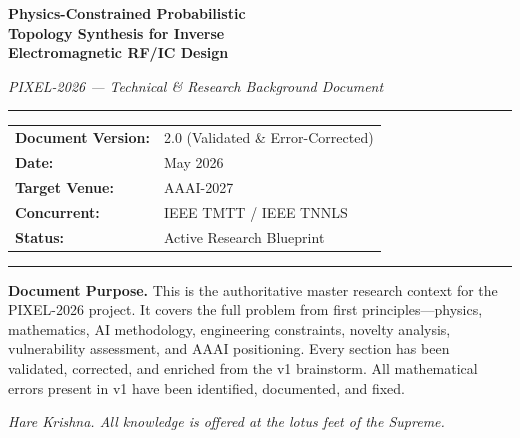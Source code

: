 \documentclass[12pt,a4paper]{article}
\theoremstyle{definition}
\theoremstyle{plain}
\theoremstyle{remark}
\begin{document}

\begin{titlepage}
  \centering
  \vspace*{1.5cm}

  {\Huge\bfseries\color{pixelblue}
    Physics-Constrained Probabilistic\\[6pt]
    Topology Synthesis for Inverse\\[6pt]
    Electromagnetic RF/IC Design\\[10pt]
  }

  \vspace{0.5cm}
  {\large\color{gray} \textit{PIXEL-2026 — Technical \& Research Background Document}}

  \vspace{1cm}
  \rule{0.8\linewidth}{1pt}

  \vspace{0.5cm}
  {\normalsize
    \begin{tabular}{ll}
      \textbf{Document Version:} & 2.0 (Validated \& Error-Corrected) \\[4pt]
      \textbf{Date:}             & May 2026 \\[4pt]
      \textbf{Target Venue:}     & AAAI-2027 \\[4pt]
      \textbf{Concurrent:}       & IEEE TMTT / IEEE TNNLS \\[4pt]
      \textbf{Status:}           & Active Research Blueprint \\
    \end{tabular}
  }

  \vspace{1cm}
  \rule{0.8\linewidth}{0.5pt}

  \vspace{0.8cm}
  \begin{tcolorbox}[notebox, width=0.85\linewidth]
    \textbf{Document Purpose.}
    This is the authoritative master research context for the PIXEL-2026 project.
    It covers the full problem from first principles—physics, mathematics, AI
    methodology, engineering constraints, novelty analysis, vulnerability assessment,
    and AAAI positioning.  Every section has been validated, corrected, and enriched
    from the v1 brainstorm.  All mathematical errors present in v1 have been
    identified, documented, and fixed.
  \end{tcolorbox}

  \vfill
  {\small\color{gray}
    \textit{Hare Krishna.  All knowledge is offered at the lotus feet of the Supreme.}
  }
\end{titlepage}
\end{document}
